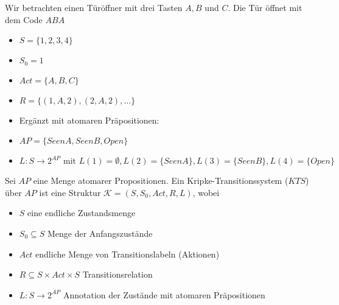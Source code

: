 \begin{bsp}
	Wir betrachten einen Türöffner mit drei Tasten $A,B$ und $C$. Die Tür öffnet mit dem Code $\mathit{ABA}$
	\begin{center}
	\end{center}

	\begin{itemize}
		\item $S=\{1,2,3,4\}$
		\item $S_0 = {1}$
		\item $\textit{Act} =  \{A,B,C\}$
		\item $R = \{(1,A,2), (2, A, 2), \dots\}$
		\item[] Ergänzt mit atomaren Präpositionen:
		\item $AP = \{\textit{SeenA}, \textit{SeenB}, \textit{Open}\}$
		\item $L:S\rightarrow2^{AP} \text{ mit } L(1) = \emptyset, L(2) = \{\textit{SeenA}\}, L(3) = \{\textit{SeenB}\}, L(4) = \{\textit{Open}\}$
	\end{itemize}
\end{bsp}

\begin{defn}
	Sei $AP$ eine Menge atomarer Propositionen. Ein Kripke-Transitionssystem ($KTS$) über $AP$ ist eine Struktur $\mathcal{K} = (S, S_0, \textit{Act}, R, L)$, wobei
	\begin{itemize}
		\item $S$ eine endliche Zustandsmenge
		\item $S_0 \subseteq S$ Menge der Anfangszustände
		\item $\textit{Act}$ endliche Menge von Transitionslabeln (Aktionen)
		\item $R \subseteq S \times \textit{Act} \times S$ Transitionsrelation
		\item $L:S\rightarrow2^{AP}$ Annotation der Zustände mit atomaren Präpositionen
	\end{itemize}
\end{defn}

